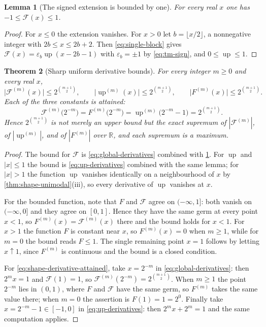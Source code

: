 \documentclass[11pt,oneside]{article}
\newtheorem{theorem}{Theorem}[section]
\newtheorem{lemma}[theorem]{Lemma}
\theoremstyle{definition}
\theoremstyle{remark}
\newcommand{\R}{\mathbb R}
\newcommand{\Up}{\operatorname{up}}
\begin{document}
\begin{lemma}[The signed extension is bounded by one]
\label{thm:shape-extension-bounded}
For every real $x$ one has $-1\le\mathcal F(x)\le1$.
\end{lemma}

\begin{proof}
For $x\le0$ the extension vanishes.  For $x>0$ let $b=\lfloor x/2\rfloor$, a nonnegative
integer with $2b\le x\le2b+2$.  Then \eqref{eq:single-block} gives
$\mathcal F(x)=\varepsilon_b\Up(x-2b-1)$ with $\varepsilon_b=\pm1$ by \eqref{eq:tm-sign}, and
$0\le\Up\le1$.
\end{proof}

\begin{theorem}[Sharp uniform derivative bounds]
\label{thm:shape-sharp-derivative-bounds}
For every integer $m\ge0$ and every real $x$,
\begin{equation}
 \bigl|\mathcal F^{(m)}(x)\bigr|\le2^{\binom{m+1}{2}},\qquad
 \bigl|\Up^{(m)}(x)\bigr|\le2^{\binom{m+1}{2}},\qquad
 \bigl|F^{(m)}(x)\bigr|\le2^{\binom{m+1}{2}}.             \label{eq:shape-derivative-bound}
\end{equation}
Each of the three constants is attained:
\begin{equation}
 \mathcal F^{(m)}\bigl(2^{-m}\bigr)=F^{(m)}\bigl(2^{-m}\bigr)
 =\Up^{(m)}\bigl(2^{-m}-1\bigr)=2^{\binom{m+1}{2}}.       \label{eq:shape-derivative-attained}
\end{equation}
Hence $2^{\binom{m+1}{2}}$ is not merely an upper bound but the exact supremum of
$|\mathcal F^{(m)}|$, of $|\Up^{(m)}|$, and of $|F^{(m)}|$ over $\R$, and each supremum is a
maximum.
\end{theorem}

\begin{proof}
The bound for $\mathcal F$ is \eqref{eq:global-derivatives} combined with
\cref{thm:shape-extension-bounded}.  For $\Up$ and $|x|\le1$ the bound is
\eqref{eq:up-derivatives} combined with the same lemma; for $|x|>1$ the function $\Up$
vanishes identically on a neighbourhood of $x$ by \cref{thm:shape-unimodal}(iii), so every
derivative of $\Up$ vanishes at $x$.

For the bounded function, note that $F$ and $\mathcal F$ agree on $(-\infty,1]$: both vanish
on $(-\infty,0]$ and they agree on $[0,1]$.  Hence they have the same germ at every point
$x<1$, so $F^{(m)}(x)=\mathcal F^{(m)}(x)$ there and the bound holds for $x<1$.  For $x>1$ the
function $F$ is constant near $x$, so $F^{(m)}(x)=0$ when $m\ge1$, while for $m=0$ the bound
reads $F\le1$.  The single remaining point $x=1$ follows by letting $x\uparrow1$, since
$F^{(m)}$ is continuous and the bound is a closed condition.

For \eqref{eq:shape-derivative-attained}, take $x=2^{-m}$ in \eqref{eq:global-derivatives}:
then $2^mx=1$ and $\mathcal F(1)=1$, so $\mathcal F^{(m)}(2^{-m})=2^{\binom{m+1}{2}}$.  When
$m\ge1$ the point $2^{-m}$ lies in $(0,1)$, where $F$ and $\mathcal F$ have the same germ, so
$F^{(m)}$ takes the same value there; when $m=0$ the assertion is $F(1)=1=2^{0}$.  Finally
take $x=2^{-m}-1\in[-1,0]$ in \eqref{eq:up-derivatives}: then $2^mx+2^m=1$ and the same
computation applies.
\end{proof}
\end{document}
